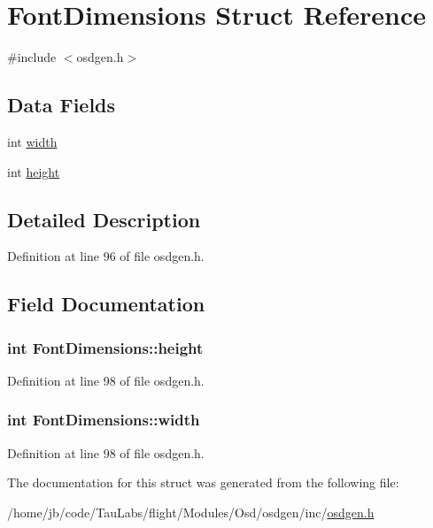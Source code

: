 \hypertarget{struct_font_dimensions}{\section{\-Font\-Dimensions \-Struct \-Reference}
\label{struct_font_dimensions}
}


{\ttfamily \#include $<$osdgen.\-h$>$}

\subsection*{\-Data \-Fields}
\begin{DoxyCompactItemize}
\item 
int \hyperlink{struct_font_dimensions_a3a7f22c09ebeb18689a296fc7b72323e}{width}
\item 
int \hyperlink{struct_font_dimensions_a0a3e31e8b25bb8b85bbf0c92135deba7}{height}
\end{DoxyCompactItemize}


\subsection{\-Detailed \-Description}


\-Definition at line 96 of file osdgen.\-h.



\subsection{\-Field \-Documentation}
\hypertarget{struct_font_dimensions_a0a3e31e8b25bb8b85bbf0c92135deba7}{
\subsubsection[{height}]{\setlength{\rightskip}{0pt plus 5cm}int {\bf \-Font\-Dimensions\-::height}}}\label{struct_font_dimensions_a0a3e31e8b25bb8b85bbf0c92135deba7}


\-Definition at line 98 of file osdgen.\-h.

\hypertarget{struct_font_dimensions_a3a7f22c09ebeb18689a296fc7b72323e}{
\subsubsection[{width}]{\setlength{\rightskip}{0pt plus 5cm}int {\bf \-Font\-Dimensions\-::width}}}\label{struct_font_dimensions_a3a7f22c09ebeb18689a296fc7b72323e}


\-Definition at line 98 of file osdgen.\-h.



\-The documentation for this struct was generated from the following file\-:\begin{DoxyCompactItemize}
\item 
/home/jb/code/\-Tau\-Labs/flight/\-Modules/\-Osd/osdgen/inc/\hyperlink{osdgen_8h}{osdgen.\-h}\end{DoxyCompactItemize}
